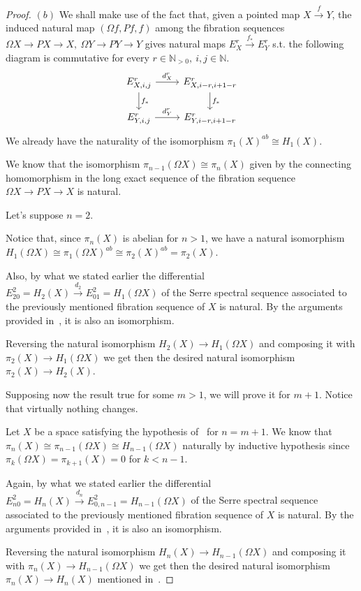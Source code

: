 \documentclass{article}
\newcommand{\numberset}{\mathbb}
\newcommand{\N}{\numberset{N}}
\begin{document}
\begin{proof}
    $(b)$ We shall make use of the fact that, given a pointed map
    $X\xrightarrow{f}Y$, the induced natural map $(\Omega f,Pf,f)$ among the
    fibration sequences $\Omega X\rightarrow PX\rightarrow X,\ \Omega
    Y\rightarrow PY\rightarrow Y$ gives natural maps $E^r_X\xrightarrow{f_*}
    E^r_Y$ s.t. the following diagram is commutative for every
    $r\in\N_{>0},\ i,j\in\N$.
    \[
        \begin{tikzcd}
            E^r_{X,i,j}\arrow{r}{d^r_X}\arrow{d}{f_*}
            & E^r_{X,i-r,i+1-r}\arrow{d}{f_*} \\
            E^r_{Y,i,j}\arrow{r}{d^r_Y}
            & E^r_{Y,i-r,i+1-r}
        \end{tikzcd}
    \]
    We already have the naturality of the isomorphism
    $\pi_1(X)^{ab}\cong H_1(X)$.

    We know that the isomorphism $\pi_{n-1}(\Omega X)\cong\pi_n(X)$ given by the
    connecting homomorphism in the long exact sequence of the fibration sequence
    $\Omega X\rightarrow PX\rightarrow X$ is natural.

    Let's suppose $n=2$.
    
    Notice that, since $\pi_n(X)$ is abelian for $n>1$, we have a natural
    isomorphism $H_1(\Omega X)\cong\pi_1(\Omega X)^{ab}\cong\pi_2(X)^{ab}=
    \pi_2(X)$.
    
    Also, by what we stated earlier the differential
    $E^2_{20}=H_2(X)\xrightarrow{d_2}E^2_{01}=H_1(\Omega X)$ of the Serre
    spectral sequence associated to the previously mentioned fibration sequence
    of $X$ is natural. By the arguments provided in~\cite[thm. 11.6]{HM19}, it
    is also an isomorphism.

    Reversing the natural isomorphism $H_2(X)\rightarrow
    H_1(\Omega X)$ and composing it with $\pi_2(X)\rightarrow
    H_1(\Omega X)$ we get then the desired natural isomorphism
    $\pi_2(X)\rightarrow H_2(X)$.

    Supposing now the result true for some $m>1$, we will prove it for $m+1$.
    Notice that virtually nothing changes.

    Let $X$ be a space satisfying the hypothesis of~\cite[thm. 11.6]{HM19} for
    $n=m+1$. We know that $\pi_n(X)\cong\pi_{n-1}(\Omega X)\cong
    H_{n-1}(\Omega X)$ naturally by inductive hypothesis since $\pi_k(\Omega X)=
    \pi_{k+1}(X)=0$ for $k<n-1$.

    Again, by what we stated earlier the differential
    $E^2_{n0}=H_n(X)\xrightarrow{d_n}E^2_{0,n-1}=H_{n-1}(\Omega X)$ of the Serre
    spectral sequence associated to the previously mentioned fibration sequence
    of $X$ is natural. By the arguments provided in~\cite[thm. 11.6]{HM19}, it
    is also an isomorphism.

    Reversing the natural isomorphism $H_n(X)\rightarrow H_{n-1}(\Omega X)$ and
    composing it with $\pi_n(X)\rightarrow H_{n-1}(\Omega X)$ we get then the
    desired natural isomorphism $\pi_n(X)\rightarrow H_n(X)$ mentioned
    in~\cite[thm. 11.6]{HM19}.
\end{proof}
\end{document}
